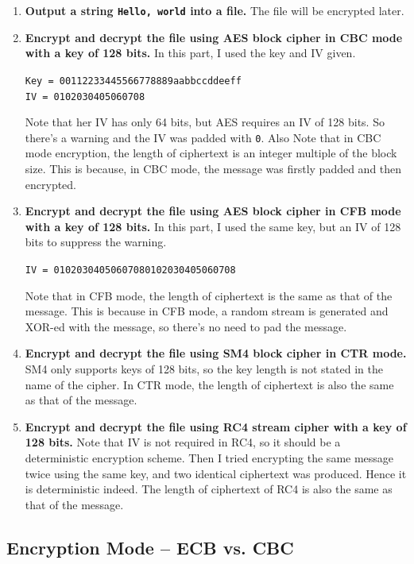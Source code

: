 \begin{enumerate}[label=(\arabic*)]
\item {
    \textbf{Output a string \texttt{Hello, world} into a file.} 
    The file will be encrypted later.
}
\item {
    \textbf{Encrypt and decrypt the file using AES block cipher in CBC mode with a key of 128 bits.} 
    In this part, I used the key and IV given.
    \begin{center}
        \texttt{Key = 00112233445566778889aabbccddeeff} \\
        \texttt{IV  = 0102030405060708}
    \end{center}
    Note that her IV has only 64 bits, but AES requires an IV of 128 bits. So there's a warning and the IV was padded with \texttt{0}. 
    Also Note that in CBC mode encryption, the length of ciphertext is an integer multiple of the block size. This is because, in CBC mode, the message was firstly padded and then encrypted.
}
\item {
    \textbf{Encrypt and decrypt the file using AES block cipher in CFB mode with a key of 128 bits. }
    In this part, I used the same key, but an IV of 128 bits to suppress the warning.
    \begin{center}
        \texttt{IV  = 01020304050607080102030405060708}
    \end{center}
    Note that in CFB mode, the length of ciphertext is the same as that of the message. This is because in CFB mode, a random stream is generated and XOR-ed with the message, so there's no need to pad the message.   
}
\item {
    \textbf{Encrypt and decrypt the file using SM4 block cipher in CTR mode.}
    SM4 only supports keys of 128 bits, so the key length is not stated in the name of the cipher.
    In CTR mode, the length of ciphertext is also the same as that of the message.
}
\item {
    \textbf{Encrypt and decrypt the file using RC4 stream cipher with a key of 128 bits.}
    Note that IV is not required in RC4, so it should be a deterministic encryption scheme. Then I tried encrypting the same message twice using the same key, and two identical ciphertext was produced. Hence it is deterministic indeed.
    The length of ciphertext of RC4 is also the same as that of the message.
}
\end{enumerate}

\subsection{Encryption Mode – ECB vs. CBC}

